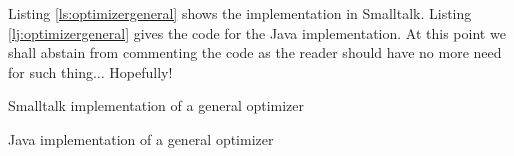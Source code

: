 \documentclass[twoside]{book}
\begin{document}
Listing \ref{ls:optimizergeneral} shows the implementation in
Smalltalk. Listing \ref{lj:optimizergeneral} gives the code for
the Java implementation. At this point we shall abstain from
commenting the code as the reader should have no more need for
such thing$\ldots$ Hopefully!

\begin{listing} Smalltalk
implementation of a general optimizer \label{ls:optimizergeneral}

\end{listing}

\begin{listing} Java
implementation of a general optimizer \label{lj:optimizergeneral}

\end{listing}
\ifx\wholebook\relax\else
\end{document}

